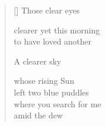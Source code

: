 \documentclass[12pt,a4paper]{article}
\begin{document}

\newpage

\poemtitle{}

\settowidth{\versewidth}{where you search for me}

\bigskip

\begin{verse}[\versewidth]
  Those clear eyes

  clearer yet this morning \\
  to have loved another

  A clearer sky

  whose rising Sun \\
  left two blue puddles \\
  where you search for me \\
  amid the dew
\end{verse}


\newpage

\poemtitle{}

\settowidth{\versewidth}{to the necklaces of their laughter}

\bigskip
\end{document}
